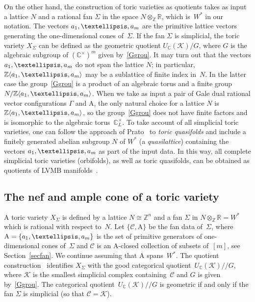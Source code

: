 \documentclass[a4paper]{amsart}
\theoremstyle{definition}
\theoremstyle{remark}
\numberwithin{equation}{section}
\def\R{\mathbb R}
\def\C{\mathbb C}
\def\R{\mathbb R}
\def\Z{\mathbb Z}
\def\sK{\mathcal K}
\newcommand{\mb}[1]{{\textbf {\textit#1}}}
\newcommand{\<}{\langle}
\renewcommand{\>}{\rangle}
\begin{document}
On the other hand, the construction of toric varieties as quotients takes as input a lattice $N$ and a rational fan $\Sigma$ in the space $N\otimes_\Z\R$, which is~$W^*$ in our notation. The vectors $\mb a_1,\ldots,\mb a_m$ are the primitive lattice vectors generating the one-dimensional cones of~$\Sigma$. If the fan $\Sigma$ is simplicial, the toric variety $X_\Sigma$ can be defined as the geometric quotient $U_\C(\sK)/G$, where $G$ is the algebraic subgroup of $(\C^\times)^m$ given by~\eqref{Ggrou}. It may turn out that the vectors $\mb a_1,\ldots,\mb a_m$ do not span the lattice $N$; in particular, $\Z\langle \mb a_1,\ldots,\mb a_m\rangle$ may be a sublattice of finite index in~$N$. In the latter case the group~\eqref{Ggrou} is a product of an algebraic torus and a finite group $N/\Z\langle \mb a_1,\ldots,\mb a_m\rangle$. When we take as input a pair of Gale dual rational vector configurations $\Gamma$ and $\mathrm A$, the only natural choice for a lattice $N$ is $\Z\langle \mb a_1,\ldots,\mb a_m\rangle$, so the group~\eqref{Ggrou} does not have finite factors and is isomorphic to the algebraic torus~$\C^\times_L$. To take account of all simplicial toric varieties, one can follow the approach of Prato~\cite{prat01} to \emph{toric quasifolds} and include a finitely generated abelian subgroup $N$ of $W^*$ (a \emph{quasilattice}) containing the vectors $\mb a_1,\ldots,\mb a_m$ as part of the input data. In this way, all complete simplicial toric varieties (orbifolds), as well as toric quasifolds, can be obtained as quotients of LVMB manifolds~\cite[Theorem~3.4]{ba-za17}.



\subsection{The nef and ample cone of a toric variety}
A toric variety $X_\Sigma$ is defined by a lattice $N\cong\Z^n$ and a fan $\Sigma$ in $N\otimes_\Z\R=W^*$ which is rational with respect to~$N$. Let $\{\mathcal C,\mathrm A\}$ be the fan data of~$\Sigma$, where 
$\mathrm A=\{\mb a_1,\ldots,\mb a_m\}$ is the set of primitive generators of one-dimensional cones of~$\Sigma$ and $\mathcal C$ is an $\mathrm A$-closed collection of subsets of~$[m]$, see Section~\ref{secfan}. We continue assuming that $\mathrm A$ spans~$W^*$. The quotient construction~\cite[\S5.1]{c-l-s11} identifies $X_\Sigma$ with the good categorical quotient~$U_\C(\mathcal K)/\!\!/G$, where $\sK$ is the smallest simplicial complex containing~$\mathcal C$ and $G$ is given by~\eqref{Ggrou}. The categorical quotient~$U_\C(\mathcal K)/\!\!/G$ is geometric if and only if the fan $\Sigma$ is simplicial (so that $\mathcal C=\mathcal K$).
\end{document}
